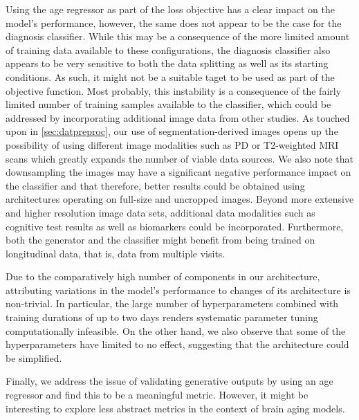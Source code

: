 Using the age regressor as part of the loss objective has a clear impact on the model's performance, however, the same does not appear to be the case for the diagnosis classifier. While this may be a consequence of the more limited amount of training data available to these configurations, the diagnosis classifier also appears to be very sensitive to both the data splitting as well as its starting conditions. As such, it might not be a suitable taget to be used as part of the objective function. Most probably, this instability is a consequence of the fairly limited number of training samples available to the classifier, which could be addressed by incorporating additional image data from other studies. As touched upon in \autoref{sec:datpreproc}, our use of segmentation-derived images opens up the possibility of using different image modalities such as PD or T2-weighted MRI scans which greatly expands the number of viable data sources.
We also note that downsampling the images may have a significant negative performance impact on the classifier and that therefore, better results could be obtained using architectures operating on full-size and uncropped images.
Beyond more extensive and higher resolution image data sets, additional data modalities such as cognitive test results as well as biomarkers could be incorporated. Furthermore, both the generator and the classifier might benefit from being trained on longitudinal data, that is, data from multiple visits.

Due to the comparatively high number of components in our architecture, attributing variations in the model's performance to changes of its architecture is non-trivial.
In particular, the large number of hyperparameters combined with training durations of up to two days renders systematic parameter tuning computationally infeasible. On the other hand, we also observe that some of the hyperparameters have limited to no effect, suggesting that the architecture could be simplified.

Finally, we address the issue of validating generative outputs by using an age regressor and find this to be a meaningful metric. However, it might be interesting to explore less abstract metrics in the context of brain aging models.

